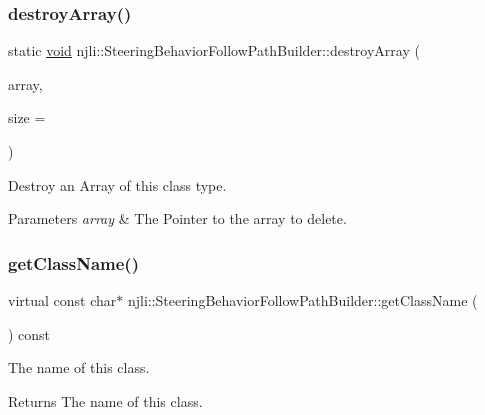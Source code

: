 \subsubsection{\texorpdfstring{destroy\+Array()}{destroyArray()}}
{\footnotesize\ttfamily static \mbox{\hyperlink{_thread_8h_af1e856da2e658414cb2456cb6f7ebc66}{void}} njli\+::\+Steering\+Behavior\+Follow\+Path\+Builder\+::destroy\+Array (\begin{DoxyParamCaption}\item[{\mbox{\hyperlink{classnjli_1_1_steering_behavior_follow_path_builder}{Steering\+Behavior\+Follow\+Path\+Builder}} $\ast$$\ast$}]{array,  }\item[{const \mbox{\hyperlink{_util_8h_a10e94b422ef0c20dcdec20d31a1f5049}{u32}}}]{size = {} }\end{DoxyParamCaption})\hspace{0.3cm}{\ttfamily [static]}}

Destroy an Array of this class type.


\begin{DoxyParams}{Parameters}
{\em array} & The Pointer to the array to delete. \\
\hline
\end{DoxyParams}
\mbox{\label{classnjli_1_1_steering_behavior_follow_path_builder_a019563c150afe91c866de2599de0a06d}} 
\subsubsection{\texorpdfstring{get\+Class\+Name()}{getClassName()}}
{\footnotesize\ttfamily virtual const char$\ast$ njli\+::\+Steering\+Behavior\+Follow\+Path\+Builder\+::get\+Class\+Name (\begin{DoxyParamCaption}{ }\end{DoxyParamCaption}) const\hspace{0.3cm}{\ttfamily [virtual]}}

The name of this class.

\begin{DoxyReturn}{Returns}
The name of this class. 
\end{DoxyReturn}


